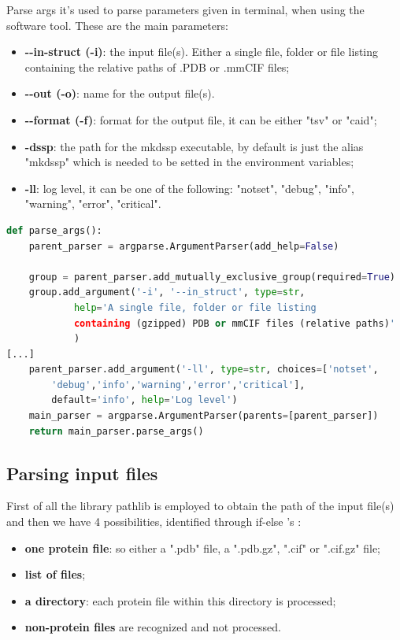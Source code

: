 Parse args it's used to parse parameters given in terminal, when using the software tool. These are the main parameters:
\begin{itemize}
    \item \textbf{-\vspace{0.1cm}-in-struct (-i)}: the input file(s). Either a single file, folder or file listing containing the relative paths of .PDB or .mmCIF files;
    \item \textbf{-\vspace{0.1cm}-out (-o)}: name for the output file(s).
    \item \textbf{-\vspace{0.1cm}-format (-f)}: format for the output file, it can be either "tsv" or "caid";
    \item \textbf{-dssp}: the path for the mkdssp executable, by default is just the alias "mkdssp" which is needed to be setted in the environment variables;
    \item \textbf{-ll}: log level, it can be one of the following: "notset", "debug", "info", "warning", "error", "critical".
\end{itemize}

\begin{lstlisting}[language=Python, caption=Command-line\ arguments\ parsing.]
def parse_args():
    parent_parser = argparse.ArgumentParser(add_help=False)

    group = parent_parser.add_mutually_exclusive_group(required=True)
    group.add_argument('-i', '--in_struct', type=str,
            help='A single file, folder or file listing 
            containing (gzipped) PDB or mmCIF files (relative paths)'
            )   
[...]
    parent_parser.add_argument('-ll', type=str, choices=['notset',
        'debug','info','warning','error','critical'], 
        default='info', help='Log level')
    main_parser = argparse.ArgumentParser(parents=[parent_parser])
    return main_parser.parse_args()
\end{lstlisting}

\pagebreak

\subsection{Parsing input files}
First of all the library pathlib is employed to obtain the path of the input file(s) and then we have 4 possibilities, identified through if-else 's :
\begin{itemize}
    \item \textbf{one protein file}: so either a ".pdb" file, a ".pdb.gz", ".cif" or ".cif.gz" file;
    \item \textbf{list of files};
    \item \textbf{a directory}: each protein file within this directory is processed;
    \item \textbf{non-protein files} are recognized and not processed.
\end{itemize}


